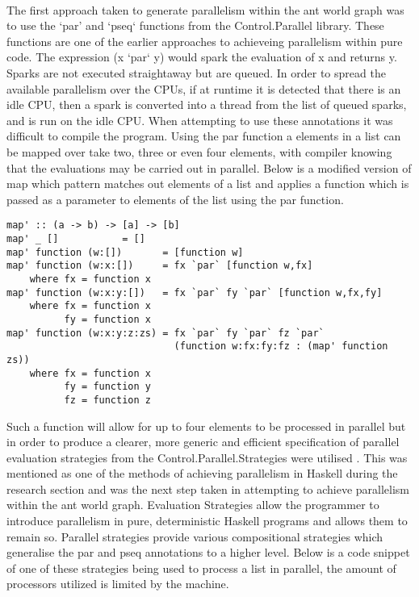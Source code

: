 \documentclass[main.tex]{subfiles}
\begin{document}
\paragraph{} The first approach taken to generate parallelism within the ant world graph was to use the `par' and `pseq` functions from the Control.Parallel library. These functions are one of the earlier approaches to achieveing parallelism within pure code. The expression (x `par` y) would spark the evaluation of x and returns y. Sparks are not executed straightaway but are queued. In order to spread the available parallelism over the CPUs, if at runtime it is detected that there is an idle CPU, then a spark is converted into a thread from the list of queued sparks, and is run on the idle CPU. When attempting to use these annotations it was difficult to compile the program. Using the par function a elements in a list can be mapped over take two, three or even four elements, with compiler knowing that the evaluations may be carried out in parallel. Below is a modified version of map which pattern matches out elements of a list and applies a function which is passed as a parameter to elements of the list using the par function.

\begin{lstlisting}
map' :: (a -> b) -> [a] -> [b]
map' _ []           = []
map' function (w:[])       = [function w]
map' function (w:x:[])     = fx `par` [function w,fx]
    where fx = function x
map' function (w:x:y:[])   = fx `par` fy `par` [function w,fx,fy]
    where fx = function x
          fy = function x
map' function (w:x:y:z:zs) = fx `par` fy `par` fz `par`
                             (function w:fx:fy:fz : (map' function zs))
    where fx = function x
          fy = function y
          fz = function z
\end{lstlisting}

Such a function will allow for up to four elements to be processed in parallel but in order to produce a clearer, more generic and efficient specification of parallel evaluation strategies from the Control.Parallel.Strategies were utilised \cite{Marlow2010a}. This was mentioned as one of the methods of achieving parallelism in Haskell during the research section and was the next step taken in attempting to achieve parallelism within the ant world graph. Evaluation Strategies allow the programmer to introduce parallelism in pure, deterministic Haskell programs and allows them to remain so. Parallel strategies provide various compositional strategies which generalise the par and pseq annotations to a higher level. Below is a code snippet of one of these strategies being used to process a list in parallel, the amount of processors utilized is limited by the machine.
\end{document}
